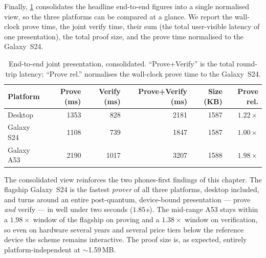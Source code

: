 \documentclass{article}
\begin{document}
Finally, \cref{tab:res-crossplatform} consolidates the headline end-to-end
figures into a single normalised view, so the three platforms can be compared at a
glance. We report the wall-clock prove time, the joint verify time, their sum (the
total user-visible latency of one presentation), the total proof size, and the
prove time normalised to the Galaxy~S24.

\begin{table}[ht]
  \centering
  \caption{End-to-end joint presentation, consolidated. ``Prove+Verify'' is the
  total round-trip latency; ``Prove rel.'' normalises the wall-clock prove time to
  the Galaxy~S24.}
  \label{tab:res-crossplatform}
  \small
  \begin{tabular}{@{}lrrrrr@{}}
    \toprule
    \textbf{Platform} & \textbf{Prove (ms)} & \textbf{Verify (ms)} & \textbf{Prove+Verify (ms)} & \textbf{Size (KB)} & \textbf{Prove rel.} \\
    \midrule
    Desktop    & 1353 & 828  & 2181 & 1587 & $1.22\times$ \\
    Galaxy S24 & 1108 & 739  & 1847 & 1587 & $1.00\times$ \\
    Galaxy A53 & 2190 & 1017 & 3207 & 1588 & $1.98\times$ \\
    \bottomrule
  \end{tabular}
\end{table}

The consolidated view reinforces the two phones-first findings of this chapter.
The flagship Galaxy~S24 is the fastest \emph{prover} of all three platforms,
desktop included, and turns around an entire post-quantum, device-bound
presentation --- prove \emph{and} verify --- in well under two seconds
($1.85$\,s). The mid-range A53 stays within a $1.98\times$ window of the flagship
on proving and a $1.38\times$ window on verification, so even on hardware several
years and several price tiers below the reference device the scheme remains
interactive. The proof size is, as expected, entirely platform-independent at
$\sim$1.59\,MB.
\end{document}

